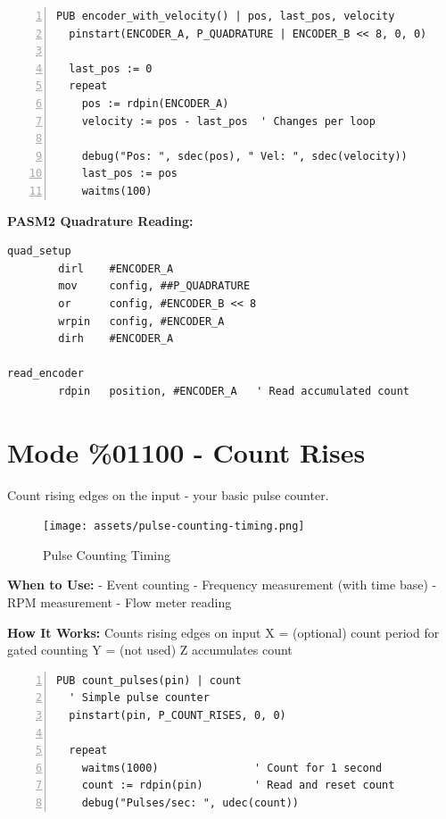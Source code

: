\documentclass[11pt,a4paper,oneside,english]{book}
\begin{document}
\begin{Spin2Block}
\begin{Verbatim}[numbers=left,numbersep=5pt,xleftmargin=15pt]
PUB encoder_with_velocity() | pos, last_pos, velocity
  pinstart(ENCODER_A, P_QUADRATURE | ENCODER_B << 8, 0, 0)
  
  last_pos := 0
  repeat
    pos := rdpin(ENCODER_A)
    velocity := pos - last_pos  ' Changes per loop
    
    debug("Pos: ", sdec(pos), " Vel: ", sdec(velocity))
    last_pos := pos
    waitms(100)
\end{Verbatim}
\end{Spin2Block}

\textbf{PASM2 Quadrature Reading:}

\begin{PASM2Block}
\begin{lstlisting}
quad_setup
        dirl    #ENCODER_A
        mov     config, ##P_QUADRATURE
        or      config, #ENCODER_B << 8
        wrpin   config, #ENCODER_A
        dirh    #ENCODER_A
        
read_encoder
        rdpin   position, #ENCODER_A   ' Read accumulated count
\end{lstlisting}
\end{PASM2Block}

\clearpage

\hypertarget{mode-01100---count-rises}{%
\section{Mode \%01100 - Count Rises}\label{mode-01100---count-rises}}

Count rising edges on the input - your basic pulse counter.

\begin{figure}
\centering
\texttt{[image: assets/pulse-counting-timing.png]}
\caption{Pulse Counting Timing}
\end{figure}

\textbf{When to Use:} - Event counting - Frequency measurement (with
time base) - RPM measurement - Flow meter reading

\textbf{How It Works:} Counts rising edges on input X = (optional) count
period for gated counting Y = (not used) Z accumulates count

\begin{Spin2Block}
\begin{Verbatim}[numbers=left,numbersep=5pt,xleftmargin=15pt]
PUB count_pulses(pin) | count
  ' Simple pulse counter
  pinstart(pin, P_COUNT_RISES, 0, 0)
  
  repeat
    waitms(1000)               ' Count for 1 second
    count := rdpin(pin)        ' Read and reset count
    debug("Pulses/sec: ", udec(count))
\end{Verbatim}
\end{Spin2Block}
\end{document}
